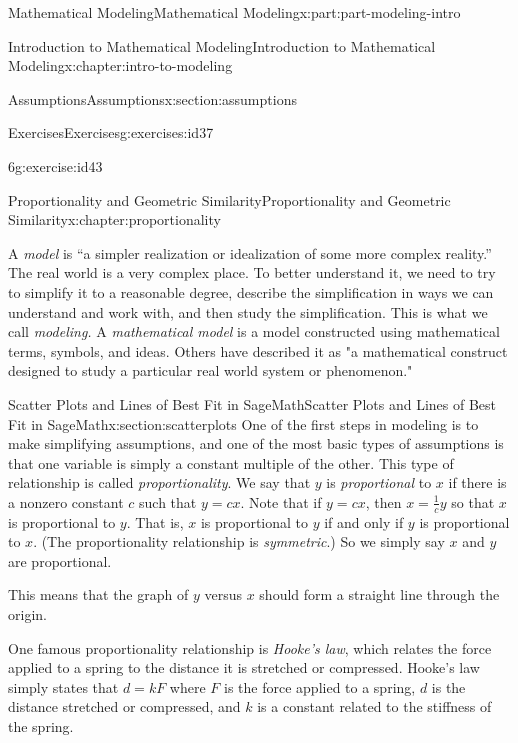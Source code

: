\documentclass[oneside,10pt,]{book}
\numberwithin{equation}{section}
\begin{document}
\begin{partptx}{Mathematical Modeling}{}{Mathematical Modeling}{}{}{x:part:part-modeling-intro}
\begin{chapterptx}{Introduction to Mathematical Modeling}{}{Introduction to Mathematical Modeling}{}{}{x:chapter:intro-to-modeling}
\begin{sectionptx}{Assumptions}{}{Assumptions}{}{}{x:section:assumptions}
\begin{exercises-subsection-numberless}{Exercises}{}{Exercises}{}{}{g:exercises:id37}
\begin{divisionexercise}{6}{}{}{g:exercise:id43}
\end{divisionexercise}%
\end{exercises-subsection-numberless}
\end{sectionptx}
\end{chapterptx}
%
\typeout{************************************************}
\typeout{************************************************}
%
\begin{chapterptx}{Proportionality and Geometric Similarity}{}{Proportionality and Geometric Similarity}{}{}{x:chapter:proportionality}
\begin{introduction}{}%
A \emph{model} is ``a simpler realization or idealization of some more complex reality.'' The real world is a very complex place. To better understand it, we need to try to simplify it to a reasonable degree, describe the simplification in ways we can understand and work with, and then study the simplification. This is what we call \emph{modeling.} A \emph{mathematical model} is a model constructed using mathematical terms, symbols, and ideas. Others have described it as "a mathematical construct designed to study a particular real world system or phenomenon."%
\end{introduction}%
%
%
\typeout{************************************************}
\typeout{************************************************}
%
\begin{sectionptx}{Scatter Plots and Lines of Best Fit in SageMath}{}{Scatter Plots and Lines of Best Fit in SageMath}{}{}{x:section:scatterplots}
One of the first steps in modeling is to make simplifying assumptions, and one of the most basic types of assumptions is that one variable is simply a constant multiple of the other. This type of relationship is called \emph{proportionality}.  We say that \(y\) is \emph{proportional} to \(x\) if there is a nonzero constant \(c\) such that \(y=cx\).  Note that if \(y=cx\), then \(x = \frac1{c}y\) so that \(x\) is proportional to \(y\).  That is, \(x\) is proportional to \(y\) if and only if \(y\) is proportional to \(x\). (The proportionality relationship is \emph{symmetric}.) So we simply say \(x\) and \(y\) are proportional.%
\par
This means that the graph of \(y\) versus \(x\) should form a straight line through the origin.%
\par
One famous proportionality relationship is \emph{Hooke's law}, which relates the force applied to a spring to the distance it is stretched or compressed.  Hooke's law simply states that \(d=kF\) where \(F\) is the force applied to a spring, \(d\) is the distance stretched or compressed, and \(k\) is a constant related to the stiffness of the spring.%

\end{sectionptx}
\end{chapterptx}
\end{partptx}
\end{document}
